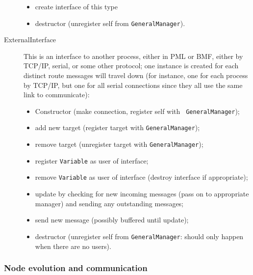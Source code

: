 \documentclass[pdftex,a4paper]{article}
\begin{document}
\begin{description}
\begin{itemize}
\item create interface of this type

\item destructor (unregister self from {\tt GeneralManager}).

\end{itemize}

\item[ExternalInterface] This is an interface to another process,
  either in PML or BMF, either by TCP/IP, serial, or some other
  protocol; one instance is created for each distinct route messages
  will travel down (for instance, one for each process by TCP/IP, but
  one for all serial connections since they all use the same link to
  communicate):

\begin{itemize}

\item Constructor (make connection, register self with {\tt
GeneralManager});

\item add new target (register target with {\tt GeneralManager});

\item remove target (unregister target with {\tt GeneralManager});

\item register {\tt Variable} as user of interface;

\item remove {\tt Variable} as user of interface (destroy interface if
appropriate);

\item update by checking for new incoming messages (pass on to
appropriate manager) and sending any outstanding messages;

\item send new message (possibly buffered until update);

\item destructor (unregister self from {\tt GeneralManager}: should
  only happen when there are no users).

\end{itemize}

\end{description}

\subsubsection{Node evolution and communication}
\label{sec:node-evol-comms}
\end{document}
